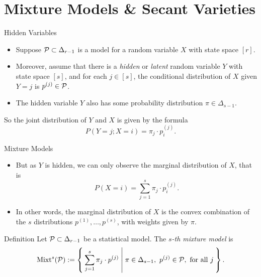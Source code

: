 \section{Mixture Models \& Secant Varieties}

\begin{frame}{Hidden Variables}
    \begin{itemize}
    \item Suppose $\mathcal{P} \subset \Delta_{r-1}$ is a model for a random variable $X$ with state space $[r]$.
    \item Moreover, assume that there is a \emph{hidden} or \emph{latent} random variable $Y$ with state space $[s]$, and for each $j \in [s]$, the conditional distribution of $X$ given $Y = j$ is $p^{(j)} \in \mathcal{P}$. 
    \item The hidden variable $Y$ also has some probability distribution $\pi \in \Delta_{s-1}$.
    \end{itemize}

    So the joint distribution of $Y$ and $X$ is given by the formula
    $$ P(Y = j; X = i) = \pi_{j} \cdot p_{i}^{(j)}. $$

\end{frame}

\begin{frame}{Mixture Models}

    \begin{itemize}
    \item But as $Y$ is hidden, we can only observe the marginal distribution of $X$, that is
    $$ P(X = i) = \sum_{j = 1}^{s} \pi_{j} \cdot p_{i}^{(j)}. $$

    \item In other words, the marginal distribution of $X$ is the convex combination of the $s$ distributions $p^{(1)}, \ldots, p^{(s)}$, with weights given by $\pi$.
    \end{itemize}

    \begin{block}{Definition}
        Let $\mathcal{P} \subset \Delta_{r-1}$ be a statistical model. The \emph{$s$-th mixture model} is
        $$ \Mixt^{s}(\mc{P}) := \Set{ \sum_{j = 1}^{s} \pi_{j}\cdot p^{(j)} | \pi \in \Delta_{s-1},\ p^{(j)} \in \mc{P}, \text{ for all } j }. $$
    \end{block}

\end{frame}

